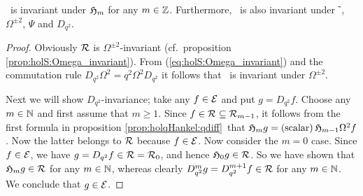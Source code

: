 \begin{prop} \label{prop:Hcore:invariance}
\hspace{2pt} \Hcore\ is invariant under $\mathfrak{H}_{m}$ for any $m\in \mathbb{Z}$.
Furthermore, \Hcore\ is also invariant under $\tilde{\:}$, $\Omega^{\pm 2}$,
$\Psi$ and  $D_{q^2}$.
\end{prop}
\begin{proof}
Obviously $\mathcal R$ is $\Omega^{\pm 2}$-invariant
(cf.\ proposition \ref{prop:holS:Omega_invariant}).
From (\ref{eq:holS:Omega_invariant}) and the commutation rule
$D_{q^2} \Omega^2 = q^2 \Omega^2 D_{q^2}$ it follows that \Hcore\ is
invariant under $\Omega^{\pm 2}$.

Next we will show $D_{q^2}$-invariance; take any $f\in\mathcal E$ and put $g=D_{q^2}f$.
Choose any $m\in \mathbb{N}$ and first assume that $m\geq 1$.
Since $f\in \mathcal R \subseteq {\mathcal R}_{m-1}$, it follows
from the first formula in proposition \ref{prop:holqHankel:qdiff}\ that
$\mathfrak{H}_{m}g = ({\rm scalar})\, \mathfrak{H}_{m-1} \Omega^2 f$.
Now the latter belongs to $\mathcal R$ because $f\in\mathcal E$.
Now consider the $m=0$ case. Since $f\in\mathcal E$, we have
$g = D_{q^2}f \in \mathcal R = {\mathcal R}_{0}$, and hence
$\mathfrak{H}_{0} g \in \mathcal R$.
So we have shown that $\mathfrak{H}_{m}g \in \mathcal R$ for any $m\in\mathbb{N}$,
whereas clearly $D_{q^2}^m g = D_{q^2}^{m+1} f \in \mathcal R$
for any $m\in\mathbb{N}$. We conclude that $g\in\mathcal E$.


\end{proof}
